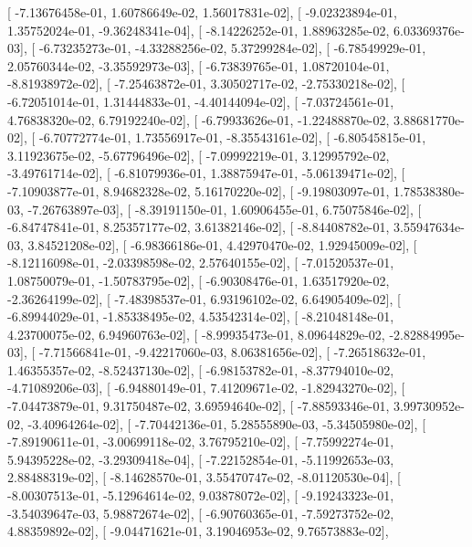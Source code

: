 \documentclass{article}
\begin{document}
       [ -7.13676458e-01,   1.60786649e-02,   1.56017831e-02],
       [ -9.02323894e-01,   1.35752024e-01,  -9.36248341e-04],
       [ -8.14226252e-01,   1.88963285e-02,   6.03369376e-03],
       [ -6.73235273e-01,  -4.33288256e-02,   5.37299284e-02],
       [ -6.78549929e-01,   2.05760344e-02,  -3.35592973e-03],
       [ -6.73839765e-01,   1.08720104e-01,  -8.81938972e-02],
       [ -7.25463872e-01,   3.30502717e-02,  -2.75330218e-02],
       [ -6.72051014e-01,   1.31444833e-01,  -4.40144094e-02],
       [ -7.03724561e-01,   4.76838320e-02,   6.79192240e-02],
       [ -6.79933626e-01,  -1.22488870e-02,   3.88681770e-02],
       [ -6.70772774e-01,   1.73556917e-01,  -8.35543161e-02],
       [ -6.80545815e-01,   3.11923675e-02,  -5.67796496e-02],
       [ -7.09992219e-01,   3.12995792e-02,  -3.49761714e-02],
       [ -6.81079936e-01,   1.38875947e-01,  -5.06139471e-02],
       [ -7.10903877e-01,   8.94682328e-02,   5.16170220e-02],
       [ -9.19803097e-01,   1.78538380e-03,  -7.26763897e-03],
       [ -8.39191150e-01,   1.60906455e-01,   6.75075846e-02],
       [ -6.84747841e-01,   8.25357177e-02,   3.61382146e-02],
       [ -8.84408782e-01,   3.55947634e-03,   3.84521208e-02],
       [ -6.98366186e-01,   4.42970470e-02,   1.92945009e-02],
       [ -8.12116098e-01,  -2.03398598e-02,   2.57640155e-02],
       [ -7.01520537e-01,   1.08750079e-01,  -1.50783795e-02],
       [ -6.90308476e-01,   1.63517920e-02,  -2.36264199e-02],
       [ -7.48398537e-01,   6.93196102e-02,   6.64905409e-02],
       [ -6.89944029e-01,  -1.85338495e-02,   4.53542314e-02],
       [ -8.21048148e-01,   4.23700075e-02,   6.94960763e-02],
       [ -8.99935473e-01,   8.09644829e-02,  -2.82884995e-03],
       [ -7.71566841e-01,  -9.42217060e-03,   8.06381656e-02],
       [ -7.26518632e-01,   1.46355357e-02,  -8.52437130e-02],
       [ -6.98153782e-01,  -8.37794010e-02,  -4.71089206e-03],
       [ -6.94880149e-01,   7.41209671e-02,  -1.82943270e-02],
       [ -7.04473879e-01,   9.31750487e-02,   3.69594640e-02],
       [ -7.88593346e-01,   3.99730952e-02,  -3.40964264e-02],
       [ -7.70442136e-01,   5.28555890e-03,  -5.34505980e-02],
       [ -7.89190611e-01,  -3.00699118e-02,   3.76795210e-02],
       [ -7.75992274e-01,   5.94395228e-02,  -3.29309418e-04],
       [ -7.22152854e-01,  -5.11992653e-03,   2.88488319e-02],
       [ -8.14628570e-01,   3.55470747e-02,  -8.01120530e-04],
       [ -8.00307513e-01,  -5.12964614e-02,   9.03878072e-02],
       [ -9.19243323e-01,  -3.54039647e-03,   5.98872674e-02],
       [ -6.90760365e-01,  -7.59273752e-02,   4.88359892e-02],
       [ -9.04471621e-01,   3.19046953e-02,   9.76573883e-02],
\end{document}
